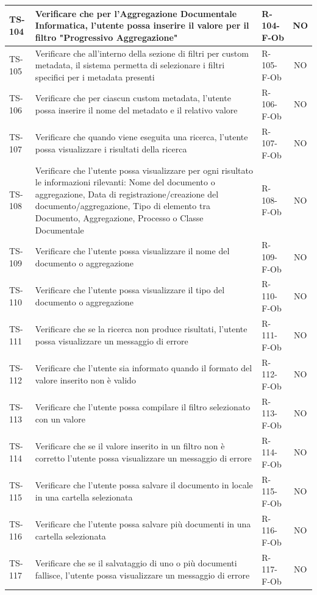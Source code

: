 \documentclass[a4paper,12pt]{article}
\begin{document}
\begin{longtable}{|p{1.5cm}|p{8.3cm}|p{2.4cm}|c|}
\hline
TS-104 & Verificare che per l'Aggregazione Documentale Informatica, l'utente possa inserire il valore per il filtro "Progressivo Aggregazione" & R-104-F-Ob & NO \\
\hline
TS-105 & Verificare che all'interno della sezione di filtri per custom metadata, il sistema permetta di selezionare i filtri specifici per i metadata presenti & R-105-F-Ob & NO \\
\hline
TS-106 & Verificare che per ciascun custom metadata, l'utente possa inserire il nome del metadato e il relativo valore & R-106-F-Ob & NO \\
\hline
TS-107 & Verificare che quando viene eseguita una ricerca, l'utente possa visualizzare i risultati della ricerca & R-107-F-Ob & NO \\
\hline
TS-108 & Verificare che l'utente possa visualizzare per ogni risultato le informazioni rilevanti: Nome del documento o aggregazione, Data di registrazione/creazione del documento/aggregazione, Tipo di elemento tra Documento, Aggregazione, Processo o Classe Documentale & R-108-F-Ob & NO \\
\hline
TS-109 & Verificare che l'utente possa visualizzare il nome del documento o aggregazione & R-109-F-Ob & NO \\
\hline
TS-110 & Verificare che l'utente possa visualizzare il tipo del documento o aggregazione & R-110-F-Ob & NO \\
\hline
TS-111 & Verificare che se la ricerca non produce risultati, l'utente possa visualizzare un messaggio di errore & R-111-F-Ob & NO \\
\hline
TS-112 & Verificare che l'utente sia informato quando il formato del valore inserito non è valido & R-112-F-Ob & NO \\
\hline
TS-113 & Verificare che l'utente possa compilare il filtro selezionato con un valore & R-113-F-Ob & NO \\
\hline
TS-114 & Verificare che se il valore inserito in un filtro non è corretto l'utente possa visualizzare un messaggio di errore & R-114-F-Ob & NO \\
\hline
TS-115 & Verificare che l'utente possa salvare il documento in locale in una cartella selezionata & R-115-F-Ob & NO \\
\hline
TS-116 & Verificare che l'utente possa salvare più documenti in una cartella selezionata & R-116-F-Ob & NO \\
\hline
TS-117 & Verificare che se il salvataggio di uno o più documenti fallisce, l'utente possa visualizzare un messaggio di errore & R-117-F-Ob & NO \\

\end{longtable}
\end{document}
